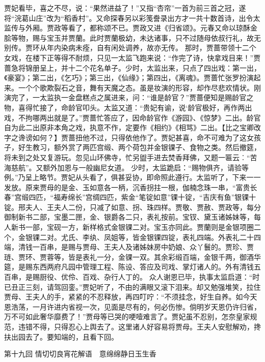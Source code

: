 \documentclass[12pt,oneside]{book}
\begin{document}
贾妃看毕，喜之不尽，说：“果然进益了！”又指“杏帘”一首为前三首之冠，遂将“浣葛山庄”改为“稻香村”。又命探春另以彩笺誊录出方才一共十数首诗，出令太监传与外厢。贾政等看了，都称颂不已。贾政又进《归省颂》。元春又命以琼酥金脍等物，赐与宝玉并贾蘭。此时贾蘭极幼，未达诸事，只不过随母依叔行礼，故无别传。贾环从年内染病未痊，自有闲处调养，故亦无传。
那时，贾蔷带领十二个女戏，在楼下正等得不耐烦，只见一太监飞跑来说：“作完了诗，快拿戏目来！”贾蔷急将锦册呈上，并十二个花名单子。少时，太监出来，只点了四出戏：第一出，《豪宴》；第二出，《乞巧》；第三出，《仙缘》；第四出，《离魂》。贾蔷忙张罗扮演起来。一个个歌欺裂石之音，舞有天魔之态。虽是妆演的形容，却作尽悲欢情状。刚演完了，一太监执一金盘糕点之属进来，问：“谁是龄官？”贾蔷便知是赐龄官之物，喜得忙接了，命龄官叩头。太监又道：“贵妃有谕，说‘龄官极好，再作两出戏，不拘哪两出就是了。”贾蔷忙答应了，因命龄官作《游园》、《惊梦》二出。龄官自为此二出原非本角之戏，执意不作，定要作《相约》《相骂》二出。【比之宝卿改字之谗谤如何？】贾蔷扭他不过，只得依他作了。贾妃甚喜，命不可难为了这女孩子，好生教习，额外赏了两匹宫缎、两个荷包并金银锞子、食物之类。然后撤筵，将未到之处又复游玩。忽见山环佛寺，忙另盥手进去焚香拜佛，又题一匾云︰“苦海慈航”。又额外加恩与一般幽尼女道。
少时，太监跪启：“赐物俱齐，请验等例。”乃呈上略节。贾妃从头看了，俱甚妥协，即命照此遵行。太监听了，下来一一发放。原来贾母的是金、玉如意各一柄，沉香拐拄一根，伽楠念珠一串，“富贵长春”宫缎四匹，“福寿绵长”宫绸四匹，紫金“笔锭如意”锞十锭，“吉庆有鱼”银锞十锭。邢夫人、王夫人二份，只减了如意、拐、珠四样。贾敬、贾赦、贾政等，每分御制新书二部，宝墨二匣，金、银爵各二只，表礼按前。宝钗、黛玉诸姊妹等，每人新书一部，宝砚一方，新样格式金银锞二对。宝玉亦同此。贾蘭则是金银项圈二个，金银锞二对。尤氏、李纨、凤姐等，皆金银锞四锭，表礼四端。外表礼二十四端，清钱一百串，是赐与贾母、王夫人及诸姊妹房中奶娘、众丫鬟的。贾珍、贾琏、贾环、贾蓉等，皆是表礼一分，金锞一双。其余彩缎百端，金银千两，御酒华筵，是赐东西两府凡园中管理工程、陈设、答应及司戏、掌灯诸人的。外有清钱五百串，是赐厨役、优伶、百戏、杂行人丁的。
众人谢恩已毕，执事太监启道：“时已丑正三刻，请驾回銮。”贾妃听了，不由的满眼又滚下泪来。却又勉强堆笑，拉住贾母、王夫人的手，紧紧的不忍释放，再四叮咛：“不须挂念，好生自养。如今天恩浩荡，一月许进内省视一次，见面是尽有的，何必伤惨。倘明岁天恩仍许归省，万不可如此奢华靡费了！”贾母等已哭的哽噎难言了。贾妃虽不忍别，怎奈皇家规范，违错不得，只得忍心上舆去了。这里诸人好容易将贾母。王夫人安慰解劝，搀扶出园去了。要知端的，且看下回。


 
第十九回  情切切良宵花解语　意绵绵静日玉生香
\end{document}
